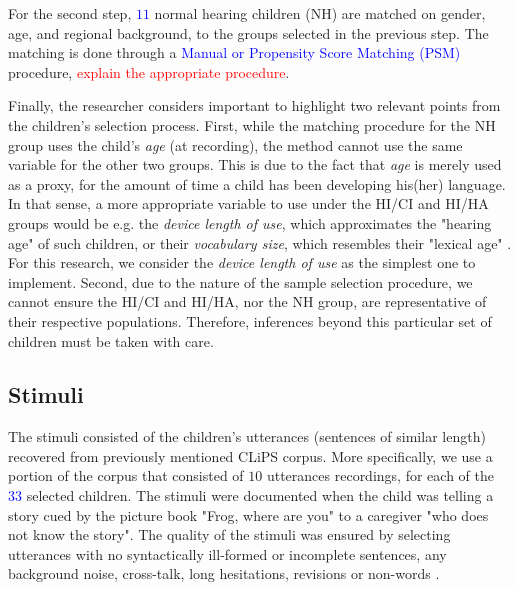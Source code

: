 For the second step, \textcolor{blue}{$11$} normal hearing children (NH) are matched on gender, age, and regional background, to the groups selected in the previous step. The matching is done through a \textcolor{blue}{Manual or Propensity Score Matching (PSM)} procedure, \textcolor{red}{explain the appropriate procedure}.

Finally, the researcher considers important to highlight two relevant points from the children's selection process. First, while the matching procedure for the NH group uses the child's \textit{age} (at recording), the method cannot use the same variable for the other two groups. This is due to the fact that \textit{age} is merely used as a proxy, for the amount of time a child has been developing his(her) language. In that sense, a more appropriate variable to use under the HI/CI and HI/HA groups would be e.g. the \textit{device length of use}, which approximates the "hearing age" of such children, or their \textit{vocabulary size}, which resembles their "lexical age" \citep{Faes_et_al_2021}. For this research, we consider the \textit{device length of use} as the simplest one to implement. Second, due to the nature of the sample selection procedure, we cannot ensure the HI/CI and HI/HA, nor the NH group, are representative of their respective populations. Therefore, inferences beyond this particular set of children must be taken with care.

\begin{comment}
\textbf{for the experimenter:} Based on \citet{Faes_et_al_2021} we depict the procedure for the experimenter:
%
\begin{enumerate}
	\item 1. matching procedure 
	\item selection of suitable stimuli
	\item determine the number of stimuli per judge 
	\item 
\end{enumerate}	
\end{comment}
%
%
\subsection{Stimuli} \label{s_sect:stimuli}
%
The stimuli consisted of the children's utterances (sentences of similar length) recovered from previously mentioned CLiPS corpus. More specifically, we use a portion of the corpus that consisted of $10$ utterances recordings, for each of the \textcolor{blue}{$33$} selected children. The stimuli were documented when the child was telling a story cued by the picture book "Frog, where are you" \citep{Mayer_1969} to a caregiver "who does not know the story". The quality of the stimuli was ensured by selecting utterances with no syntactically ill-formed or incomplete sentences, any background noise, cross-talk, long hesitations, revisions or non-words \citep{Boonen_et_al_2021}. 

